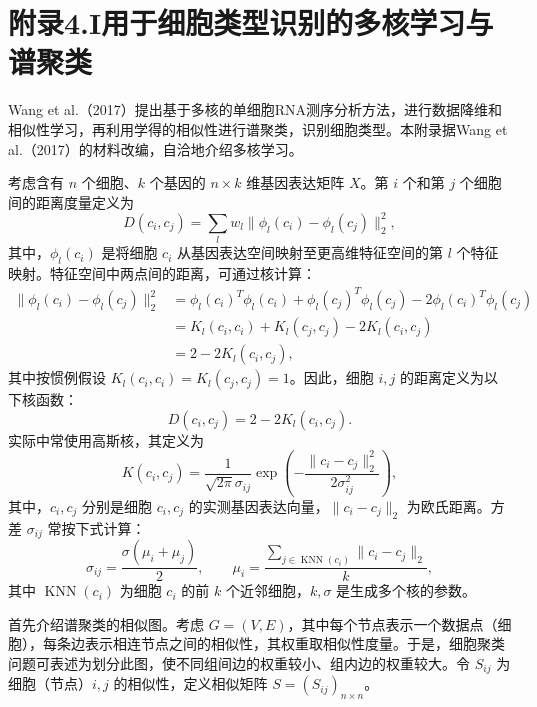 \section*{附录4.I\quad 用于细胞类型识别的多核学习与谱聚类}

Wang et al.（2017）提出基于多核的单细胞RNA测序分析方法，进行数据降维和相似性学习，再利用学得的相似性进行谱聚类，识别细胞类型。本附录据Wang et al.（2017）的材料改编，自洽地介绍多核学习。

考虑含有 $n$ 个细胞、$k$ 个基因的 $n\times k$ 维基因表达矩阵 $X$。第 $i$ 个和第 $j$ 个细胞间的距离度量定义为
\begin{equation}
D(c_i,c_j)=\sum_lw_l\|\phi_l(c_i)-\phi_l(c_j)\|_2^2,\tag{4.I.1}
\end{equation}
其中，$\phi_l(c_i)$ 是将细胞 $c_i$ 从基因表达空间映射至更高维特征空间的第 $l$ 个特征映射。特征空间中两点间的距离，可通过核计算：
\begin{equation}
\begin{aligned}
\|\phi_l(c_i)-\phi_l(c_j)\|_2^2
&=\phi_l(c_i)^T\phi_l(c_i)+\phi_l(c_j)^T\phi_l(c_j)
-2\phi_l(c_i)^T\phi_l(c_j)\\
&=K_l(c_i,c_i)+K_l(c_j,c_j)-2K_l(c_i,c_j)\\
&=2-2K_l(c_i,c_j),
\end{aligned}\tag{4.I.2}
\end{equation}
其中按惯例假设 $K_l(c_i,c_i)=K_l(c_j,c_j)=1$。因此，细胞 $i,j$ 的距离定义为以下核函数：
\begin{equation}
D(c_i,c_j)=2-2K_l(c_i,c_j).\tag{4.I.3}
\end{equation}
实际中常使用高斯核，其定义为
\begin{equation}
K(c_i,c_j)=\frac1{\sqrt{2\pi}\sigma_{ij}}
\exp\left(-\frac{\|c_i-c_j\|_2^2}{2\sigma_{ij}^2}\right),\tag{4.I.4}
\end{equation}
其中，$c_i,c_j$ 分别是细胞 $c_i,c_j$ 的实测基因表达向量，$\|c_i-c_j\|_2$ 为欧氏距离。方差 $\sigma_{ij}$ 常按下式计算：
\begin{equation}
\sigma_{ij}=\frac{\sigma(\mu_i+\mu_j)}2,\qquad
\mu_i=\frac{\sum_{j\in\operatorname{KNN}(c_i)}\|c_i-c_j\|_2}{k},\tag{4.I.5}
\end{equation}
其中 $\operatorname{KNN}(c_i)$ 为细胞 $c_i$ 的前 $k$ 个近邻细胞，$k,\sigma$ 是生成多个核的参数。

首先介绍谱聚类的相似图。考虑 $G=(V,E)$，其中每个节点表示一个数据点（细胞），每条边表示相连节点之间的相似性，其权重取相似性度量。于是，细胞聚类问题可表述为划分此图，使不同组间边的权重较小、组内边的权重较大。令 $S_{ij}$ 为细胞（节点）$i,j$ 的相似性，定义相似矩阵 $S=(S_{ij})_{n\times n}$。

